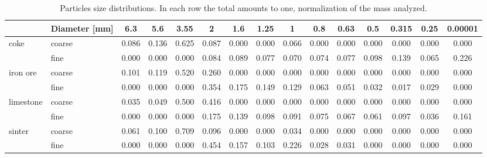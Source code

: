 \begin{sidewaystable}%
\centering
\begin{tabular}{ll|ccccccccccccc}
\hline
          & Diameter [mm] & 6.3   & 5.6   & 3.55  & 2     & 1.6   & 1.25  & 1     & 0.8   & 0.63  & 0.5   & 0.315 & 0.25  & 0.00001 \\
\hline
    coke  & coarse & 0.086 & 0.136 & 0.625 & 0.087 & 0.000 & 0.000 & 0.066 & 0.000 & 0.000 & 0.000 & 0.000 & 0.000 & 0.000 \\
      & fine & 0.000 & 0.000 & 0.000 & 0.084 & 0.089 & 0.077 & 0.070 & 0.074 & 0.077 & 0.098 & 0.139 & 0.065 & 0.226 \\
\hline
    iron ore & coarse & 0.101 & 0.119 & 0.520 & 0.260
    & 0.000 & 0.000 & 0.000 & 0.000 & 0.000 & 0.000 & 0.000 & 0.000 & 0.000 \\
     & fine & 0.000 & 0.000 & 0.000 & 0.354 & 0.175 & 0.149 & 0.129 & 0.063 & 0.051 & 0.032 & 0.017 & 0.029 & 0.000 \\
\hline
    limestone & coarse & 0.035 & 0.049 & 0.500 & 0.416 & 0.000 & 0.000 & 0.000 & 0.000 & 0.000 & 0.000 & 0.000 & 0.000 & 0.000 \\
     & fine & 0.000 & 0.000 & 0.000 & 0.175 & 0.139 & 0.098 & 0.091 & 0.075 & 0.067 & 0.061 & 0.097 & 0.036 & 0.161 \\
\hline
    sinter & coarse & 0.061 & 0.100 & 0.709 & 0.096 & 0.000 & 0.000 & 0.034 & 0.000 & 0.000 & 0.000 & 0.000 & 0.000 & 0.000 \\
     & fine & 0.000 & 0.000 & 0.000 & 0.454 & 0.157 & 0.103 & 0.226 & 0.028 & 0.031 & 0.000 & 0.000 & 0.000 & 0.000 \\
    
\hline
\end{tabular}
\caption[Particles size distributions]{Particles size distributions. In each
row the total amounts to one, normalization of the mass analyzed.}
\label{tab:19particlesizedistributions}
\end{sidewaystable}